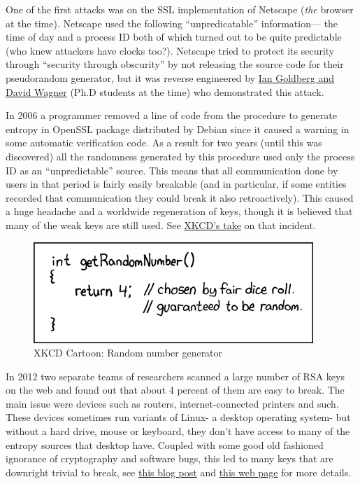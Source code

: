 One of the first attacks was on the SSL implementation of Netscape
(\emph{the} browser at the time). Netscape used the following
``unpredicatable'' information--- the time of day and a process ID both
of which turned out to be quite predictable (who knew attackers have
clocks too?). Netscape tried to protect its security through ``security
through obscurity'' by not releasing the source code for their
pseudorandom generator, but it was reverse engineered by
\href{https://www.cs.berkeley.edu/~daw/papers/ddj-netscape.html}{Ian
Goldberg and David Wagner} (Ph.D students at the time) who demonstrated
this attack.

In 2006 a programmer removed a line of code from the procedure to
generate entropy in OpenSSL package distributed by Debian since it
caused a warning in some automatic verification code. As a result for
two years (until this was discovered) all the randomness generated by
this procedure used only the process ID as an ``unpredictable'' source.
This means that all communication done by users in that period is fairly
easily breakable (and in particular, if some entities recorded that
communication they could break it also retroactively). This caused a
huge headache and a worldwide regeneration of keys, though it is
believed that many of the weak keys are still used. See
\href{http://www.xkcd.com/424/}{XKCD's take} on that incident.


\begin{figure}
\centering
\includegraphics[width=\textwidth, height=0.25\paperheight, keepaspectratio]{../figure/random_number.png}
\caption{XKCD Cartoon: Random number generator}
\label{tmplabelfig}
\end{figure}

In 2012 two separate teams of researchers scanned a large number of RSA
keys on the web and found out that about 4 percent of them are easy to
break. The main issue were devices such as routers, internet-connected
printers and such. These devices sometimes run variants of Linux- a
desktop operating system- but without a hard drive, mouse or keyboard,
they don't have access to many of the entropy sources that desktop have.
Coupled with some good old fashioned ignorance of cryptography and
software bugs, this led to many keys that are downright trivial to
break, see
\href{https://freedom-to-tinker.com/blog/nadiah/new-research-theres-no-need-panic-over-factorable-keys-just-mind-your-ps-and-qs/}{this
blog post} and \href{https://factorable.net/}{this web page} for more
details.

